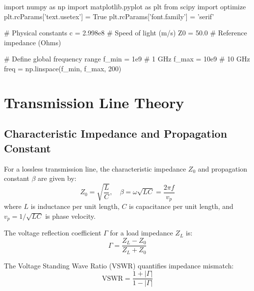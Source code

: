 \documentclass[11pt,a4paper]{article}
\begin{document}
\begin{pycode}
import numpy as np
import matplotlib.pyplot as plt
from scipy import optimize
plt.rcParams['text.usetex'] = True
plt.rcParams['font.family'] = 'serif'

# Physical constants
c = 2.998e8  # Speed of light (m/s)
Z0 = 50.0    # Reference impedance (Ohms)

# Define global frequency range
f_min = 1e9   # 1 GHz
f_max = 10e9  # 10 GHz
freq = np.linspace(f_min, f_max, 200)
\end{pycode}

\section{Transmission Line Theory}

\subsection{Characteristic Impedance and Propagation Constant}

For a lossless transmission line, the characteristic impedance $Z_0$ and propagation constant $\beta$ are given by:
\begin{equation}
Z_0 = \sqrt{\frac{L}{C}}, \quad \beta = \omega\sqrt{LC} = \frac{2\pi f}{v_p}
\end{equation}
where $L$ is inductance per unit length, $C$ is capacitance per unit length, and $v_p = 1/\sqrt{LC}$ is phase velocity.

The voltage reflection coefficient $\Gamma$ for a load impedance $Z_L$ is:
\begin{equation}
\Gamma = \frac{Z_L - Z_0}{Z_L + Z_0}
\end{equation}

The Voltage Standing Wave Ratio (VSWR) quantifies impedance mismatch:
\begin{equation}
\text{VSWR} = \frac{1 + |\Gamma|}{1 - |\Gamma|}
\end{equation}
\end{document}
